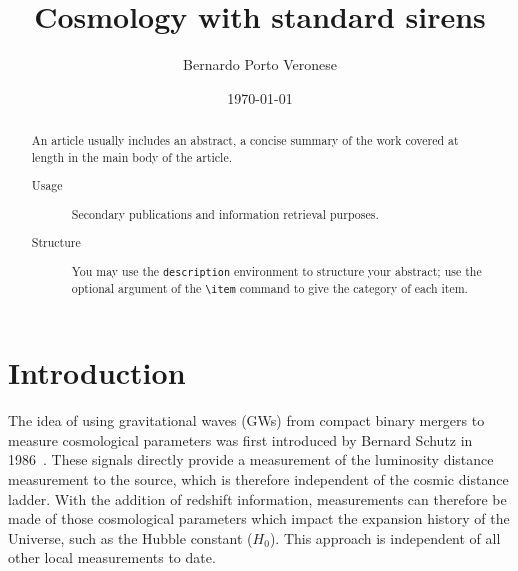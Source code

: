 \documentclass[%
 reprint,
 amsmath,amssymb,
 aps,
]{revtex4-2}
\begin{document}

\title{Cosmology with standard sirens}

\author{Bernardo Porto Veronese}
%


\date{\today}%

\begin{abstract}
	An article usually includes an abstract, a concise summary of the work
	covered at length in the main body of the article.
	\begin{description}
		\item[Usage] Secondary publications and information retrieval purposes.
		\item[Structure] You may use the \texttt{description} environment to structure your abstract; use the
		      optional argument of the \verb+\item+ command to give the category of each item.
	\end{description}
\end{abstract}

\maketitle


\section{\label{sec:introduction}Introduction} The idea of using gravitational waves (GWs) from compact binary mergers to measure
cosmological parameters was first introduced by Bernard Schutz in 1986~\cite{Schutz:1986gp}. These
signals directly provide a measurement of the luminosity distance measurement to the source, which
is therefore independent of the cosmic distance ladder. With the addition of redshift information,
measurements can therefore be made of those cosmological parameters which impact the expansion
history of the Universe, such as the Hubble constant ($H_0$). This approach is independent of all
other local measurements to date.
\end{document}
